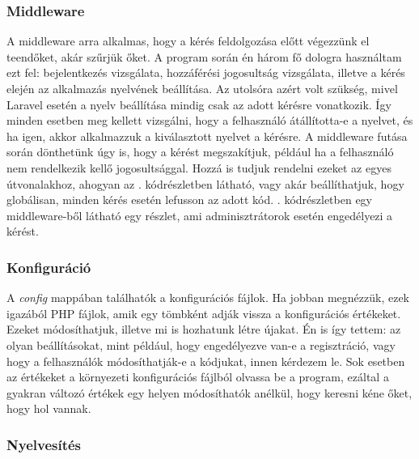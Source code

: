 \documentclass[
]{thesis-ekf}
\theoremstyle{definition}
\theoremstyle{remark}
\begin{document}
\subsubsection{Middleware}

A middleware arra alkalmas, hogy a kérés feldolgozása előtt végezzünk el teendőket, akár szűrjük őket.\cite{middleware} A program során én három fő dologra használtam ezt fel: bejelentkezés vizsgálata, hozzáférési jogosultság vizsgálata, illetve a kérés elején az alkalmazás nyelvének beállítása. Az utolsóra azért volt szükség, mivel Laravel esetén a nyelv beállítása mindig csak az adott kérésre vonatkozik. Így minden esetben meg kellett vizsgálni, hogy a felhasználó átállította-e a nyelvet, és ha igen, akkor alkalmazzuk a kiválasztott nyelvet a kérésre. A middleware futása során dönthetünk úgy is, hogy a kérést megszakítjuk, például ha a felhasználó nem rendelkezik kellő jogosultsággal. Hozzá is tudjuk rendelni ezeket az egyes útvonalakhoz, ahogyan az . kódrészletben látható, vagy akár beállíthatjuk, hogy globálisan, minden kérés esetén lefusson az adott kód. . kódrészletben egy middleware-ből látható egy részlet, ami adminisztrátorok esetén engedélyezi a kérést.



\subsubsection{Konfiguráció}

A \emph{config} mappában találhatók a konfigurációs fájlok. Ha jobban megnézzük, ezek igazából PHP fájlok, amik egy tömbként adják vissza a konfigurációs értékeket. Ezeket módosíthatjuk, illetve mi is hozhatunk létre újakat. Én is így tettem: az olyan beállításokat, mint például, hogy engedélyezve van-e a regisztráció, vagy hogy a felhasználók módosíthatják-e a kódjukat, innen kérdezem le. Sok esetben az értékeket a környezeti konfigurációs fájlból olvassa be a program, ezáltal a gyakran változó értékek egy helyen módosíthatók anélkül, hogy keresni kéne őket, hogy hol vannak.

\subsubsection{Nyelvesítés}
\end{document}
